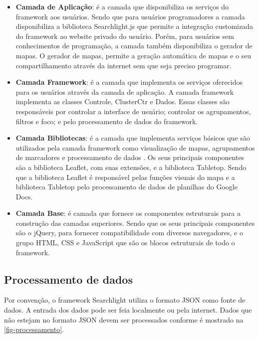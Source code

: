 \begin{itemize}
\item \textbf{Camada de Aplicação}: é a camada que disponibiliza os serviços do framework aos usuários. Sendo que para usuários programadores a camada disponibiliza a biblioteca Searchlight.js que permite a integração customizada do framework ao website privado do usuário. Porém, para usuários sem conhecimentos de programação, a camada também disponibiliza o gerador de mapas. O gerador de mapas, permite a geração automática de mapas e o seu compartilhamento através da internet sem que seja preciso programar.

\item \textbf{Camada Framework}: é a camada que implementa os serviços oferecidos para os usuários através da camada de aplicação. A camada framework implementa as classes Controle, ClusterCtr e Dados. Essas classes são responsáveis  por controlar a interface de usuário; controlar os agrupamentos, filtros e foco; e pelo processamento de dados do framework. 

\item \textbf{Camada Bibliotecas}: é a camada que implementa  serviços básicos que são utilizados pela camada framework como visualização de mapas, agrupamentos de marcadores e processamento de dados . Os seus principais componentes são a biblioteca Leaflet, com suas extensões, e a biblioteca Tabletop. Sendo que a biblioteca Leaflet é responsável pelas funções visuais do mapa e a biblioteca Tabletop pelo processamento de dados de planilhas do Google Docs.

\item \textbf{Camada Base}: é camada que fornece os componentes estruturais para a construção das camadas superiores. Sendo que os seus principais componentes são o jQuery, para fornecer compatibilidade com  diversos navegadores, e o grupo HTML, CSS e JavaScript que são os blocos estruturais de todo o framework.
 


\end{itemize}



	\subsection{Processamento de dados}
	Por convenção, o framework Searchlight utiliza o formato JSON como fonte de dados. A entrada dos dados pode ser feia localmente ou pela internet. Dados que não estejam no formato JSON devem ser processados conforme é mostrado na \autoref{fig-processamento}. 
	
